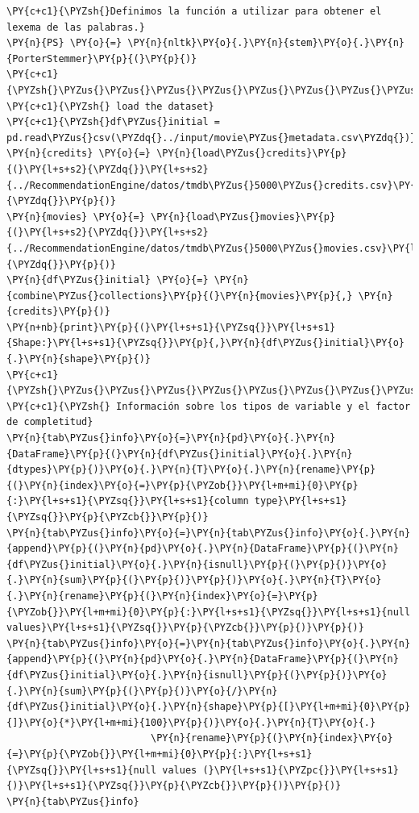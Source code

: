 \begin{tcolorbox}[breakable, size=fbox, boxrule=1pt, pad at break*=1mm,colback=cellbackground, colframe=cellborder]
\begin{Verbatim}[commandchars=\\\{\}]
\PY{c+c1}{\PYZsh{}Definimos la función a utilizar para obtener el lexema de las palabras.}
\PY{n}{PS} \PY{o}{=} \PY{n}{nltk}\PY{o}{.}\PY{n}{stem}\PY{o}{.}\PY{n}{PorterStemmer}\PY{p}{(}\PY{p}{)}
\PY{c+c1}{\PYZsh{}\PYZus{}\PYZus{}\PYZus{}\PYZus{}\PYZus{}\PYZus{}\PYZus{}\PYZus{}\PYZus{}\PYZus{}\PYZus{}\PYZus{}\PYZus{}\PYZus{}\PYZus{}\PYZus{}\PYZus{}\PYZus{}}
\PY{c+c1}{\PYZsh{} load the dataset}
\PY{c+c1}{\PYZsh{}df\PYZus{}initial = pd.read\PYZus{}csv(\PYZdq{}../input/movie\PYZus{}metadata.csv\PYZdq{})}
\PY{n}{credits} \PY{o}{=} \PY{n}{load\PYZus{}credits}\PY{p}{(}\PY{l+s+s2}{\PYZdq{}}\PY{l+s+s2}{../RecommendationEngine/datos/tmdb\PYZus{}5000\PYZus{}credits.csv}\PY{l+s+s2}{\PYZdq{}}\PY{p}{)}
\PY{n}{movies} \PY{o}{=} \PY{n}{load\PYZus{}movies}\PY{p}{(}\PY{l+s+s2}{\PYZdq{}}\PY{l+s+s2}{../RecommendationEngine/datos/tmdb\PYZus{}5000\PYZus{}movies.csv}\PY{l+s+s2}{\PYZdq{}}\PY{p}{)}
\PY{n}{df\PYZus{}initial} \PY{o}{=} \PY{n}{combine\PYZus{}collections}\PY{p}{(}\PY{n}{movies}\PY{p}{,} \PY{n}{credits}\PY{p}{)}
\PY{n+nb}{print}\PY{p}{(}\PY{l+s+s1}{\PYZsq{}}\PY{l+s+s1}{Shape:}\PY{l+s+s1}{\PYZsq{}}\PY{p}{,}\PY{n}{df\PYZus{}initial}\PY{o}{.}\PY{n}{shape}\PY{p}{)}
\PY{c+c1}{\PYZsh{}\PYZus{}\PYZus{}\PYZus{}\PYZus{}\PYZus{}\PYZus{}\PYZus{}\PYZus{}\PYZus{}\PYZus{}\PYZus{}\PYZus{}\PYZus{}\PYZus{}\PYZus{}\PYZus{}\PYZus{}\PYZus{}\PYZus{}\PYZus{}\PYZus{}\PYZus{}\PYZus{}\PYZus{}\PYZus{}\PYZus{}\PYZus{}\PYZus{}\PYZus{}\PYZus{}\PYZus{}\PYZus{}\PYZus{}\PYZus{}\PYZus{}\PYZus{}\PYZus{}\PYZus{}\PYZus{}\PYZus{}\PYZus{}\PYZus{}}
\PY{c+c1}{\PYZsh{} Información sobre los tipos de variable y el factor de completitud}
\PY{n}{tab\PYZus{}info}\PY{o}{=}\PY{n}{pd}\PY{o}{.}\PY{n}{DataFrame}\PY{p}{(}\PY{n}{df\PYZus{}initial}\PY{o}{.}\PY{n}{dtypes}\PY{p}{)}\PY{o}{.}\PY{n}{T}\PY{o}{.}\PY{n}{rename}\PY{p}{(}\PY{n}{index}\PY{o}{=}\PY{p}{\PYZob{}}\PY{l+m+mi}{0}\PY{p}{:}\PY{l+s+s1}{\PYZsq{}}\PY{l+s+s1}{column type}\PY{l+s+s1}{\PYZsq{}}\PY{p}{\PYZcb{}}\PY{p}{)}
\PY{n}{tab\PYZus{}info}\PY{o}{=}\PY{n}{tab\PYZus{}info}\PY{o}{.}\PY{n}{append}\PY{p}{(}\PY{n}{pd}\PY{o}{.}\PY{n}{DataFrame}\PY{p}{(}\PY{n}{df\PYZus{}initial}\PY{o}{.}\PY{n}{isnull}\PY{p}{(}\PY{p}{)}\PY{o}{.}\PY{n}{sum}\PY{p}{(}\PY{p}{)}\PY{p}{)}\PY{o}{.}\PY{n}{T}\PY{o}{.}\PY{n}{rename}\PY{p}{(}\PY{n}{index}\PY{o}{=}\PY{p}{\PYZob{}}\PY{l+m+mi}{0}\PY{p}{:}\PY{l+s+s1}{\PYZsq{}}\PY{l+s+s1}{null values}\PY{l+s+s1}{\PYZsq{}}\PY{p}{\PYZcb{}}\PY{p}{)}\PY{p}{)}
\PY{n}{tab\PYZus{}info}\PY{o}{=}\PY{n}{tab\PYZus{}info}\PY{o}{.}\PY{n}{append}\PY{p}{(}\PY{n}{pd}\PY{o}{.}\PY{n}{DataFrame}\PY{p}{(}\PY{n}{df\PYZus{}initial}\PY{o}{.}\PY{n}{isnull}\PY{p}{(}\PY{p}{)}\PY{o}{.}\PY{n}{sum}\PY{p}{(}\PY{p}{)}\PY{o}{/}\PY{n}{df\PYZus{}initial}\PY{o}{.}\PY{n}{shape}\PY{p}{[}\PY{l+m+mi}{0}\PY{p}{]}\PY{o}{*}\PY{l+m+mi}{100}\PY{p}{)}\PY{o}{.}\PY{n}{T}\PY{o}{.}
                         \PY{n}{rename}\PY{p}{(}\PY{n}{index}\PY{o}{=}\PY{p}{\PYZob{}}\PY{l+m+mi}{0}\PY{p}{:}\PY{l+s+s1}{\PYZsq{}}\PY{l+s+s1}{null values (}\PY{l+s+s1}{\PYZpc{}}\PY{l+s+s1}{)}\PY{l+s+s1}{\PYZsq{}}\PY{p}{\PYZcb{}}\PY{p}{)}\PY{p}{)}
\PY{n}{tab\PYZus{}info}
\end{Verbatim}
\end{tcolorbox}

